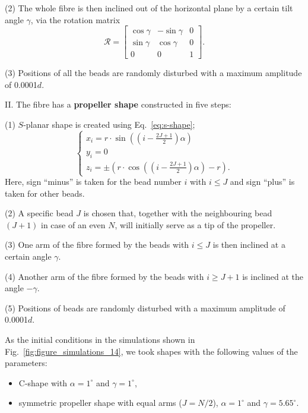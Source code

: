 \documentclass{article}
\begin{document}
(2) The whole fibre is then inclined out of the horizontal plane by a certain tilt angle $\gamma$, 
 via the rotation matrix 
\begin{equation}
    \mathcal{R} =
    \begin{bmatrix}
        \cos \gamma & -\sin \gamma & 0 \\
        \sin \gamma &  \cos \gamma & 0 \\
                  0 &            0 & 1
    \end{bmatrix}.
    \label{eq:rot-matrix}
\end{equation}

(3) Positions of all the beads are randomly disturbed with a maximum amplitude of 0.0001$d$.

 II. The fibre has a {\bf propeller shape} constructed in five steps: 
 
 (1) $S$-planar shape is created using Eq.~\ref{eq:s-shape}; 
 \begin{equation}
  \begin{cases}
    x_i = r \cdot \sin \left( \left( i - \frac{2J+1}{2} \right) \alpha \right) \\
    y_i = 0 \\
    z_i = \pm \left( r \cdot \cos \left( \left( i - \frac{2J+1}{2} \right) \alpha \right) - r \right) .
  \end{cases}
  \label{eq:s-shape}
\end{equation}
Here, 
sign ``minus” is taken for the bead number $i$ with $i \le J$ and sign ``plus” is taken for other beads.

 
 (2) A specific bead $J$ is chosen that, together with the neighbouring bead $(J+1)$ in case of an even $N$, will initially serve as a tip of the propeller.
 
 (3) One arm of the fibre formed by the beads with $i \le J$ is then inclined at a certain angle $\gamma$.
 
 (4) Another arm of the fibre formed by the beads with $i \ge J+1$ is %
  inclined at the angle $-\gamma$.
  
  (5) Positions of beads are randomly disturbed with a maximum amplitude of 0.0001$d$. 
  




As the initial conditions in the simulations shown in Fig.~\ref{fig:figure_simulations_14}, we took shapes with the following values of the parameters: 
\begin{itemize}
    \item C-shape with $\alpha=1^{\circ}$ and $\gamma=1^{\circ}$, %
\item symmetric propeller shape with 
    equal arms ($J\!=\!N/2$),  $\alpha=1^{\circ}$ and $\gamma=5.65^{\circ}$. %
\end{itemize}
\end{document}
